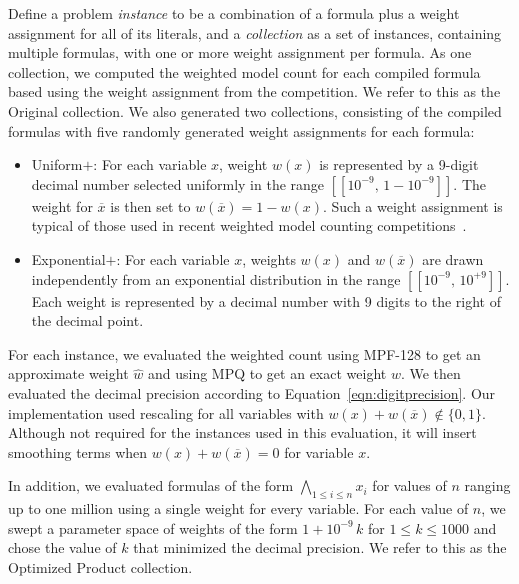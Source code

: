 \documentclass[
hf
]{ceurart}
\newcommand{\obar}[1]{\overline{#1}}
\newcommand{\approximate}[1]{\hat{#1}}
\newcommand{\approxw}{\approximate{w}}
\newcommand{\interval}[1]{[\![#1]\!]}
\begin{document}
Define a problem \emph{instance} to be a combination of a formula plus
a weight assignment for all of its literals, and a \emph{collection}
as a set of instances, containing multiple formulas, with one or more
weight assignment per formula.  As one collection, we computed the
weighted model count for each compiled formula based using the weight
assignment from the competition.  We refer to this as the
\textsf{Original} collection.  We also generated two collections,
consisting of the compiled formulas with five randomly generated
weight assignments for each formula:
\begin{itemize}
\item \textsf{Uniform$+$}: For each variable $x$, weight $w(x)$ is represented by a 9-digit decimal number selected uniformly in the range
  $\interval{10^{-9},\,1-10^{-9}}$. The weight for $\obar{x}$ is then set to
  $w(\obar{x}) = 1-w(x)$.  Such a weight assignment is typical of those used in recent weighted model counting competitions~\cite{fichte:jea:2020}.
\item \textsf{Exponential$+$}: For each variable $x$, weights $w(x)$ and $w(\obar{x})$
  are drawn independently from an exponential distribution in the range
  $\interval{10^{-9},\,10^{+9}}$.  Each weight is represented by a decimal number with 9 digits to the right of the decimal point.
\end{itemize}


For each instance, we evaluated
the weighted count using MPF-128
to get an approximate weight $\approxw$ and
using MPQ to get an exact weight $w$.  We then evaluated the decimal precision according to Equation~\ref{eqn:digitprecision}.   Our implementation used rescaling for all variables
with $w(x) + w(\obar{x}) \not \in \{0, 1\}$.
Although not required for the instances used in this evaluation,
it will insert smoothing terms when $w(x) + w(\obar{x}) = 0$ for variable $x$.

In addition, we evaluated formulas of the form $\bigwedge_{1\leq i
  \leq n} x_i$ for values of $n$ ranging up to one million using a
single weight for every variable.  For each value of $n$, we swept a parameter space of
weights of the form $1 + 10^{-9}\,k$ for $1 \leq k \leq 1000$ and
chose the value of $k$ that minimized the decimal precision.  We refer
to this as the \textsf{Optimized Product} collection.
\end{document}
